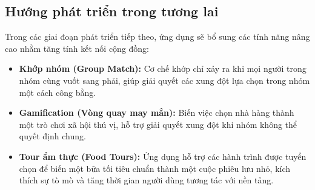 \subsection{Hướng phát triển trong tương lai}
Trong các giai đoạn phát triển tiếp theo, ứng dụng sẽ bổ sung các tính năng nâng cao nhằm tăng tính kết nối cộng đồng:
\begin{itemize}
    \item \textbf{Khớp nhóm (Group Match):} Cơ chế khớp chỉ xảy ra khi mọi người trong nhóm cùng vuốt sang phải, giúp giải quyết các xung đột lựa chọn trong nhóm một cách công bằng.
    \item \textbf{Gamification (Vòng quay may mắn):} Biến việc chọn nhà hàng thành một trò chơi xã hội thú vị, hỗ trợ giải quyết xung đột khi nhóm không thể quyết định chung.
    \item \textbf{Tour ẩm thực (Food Tours):} Ứng dụng hỗ trợ các hành trình được tuyển chọn để biến một bữa tối tiêu chuẩn thành một cuộc phiêu lưu nhỏ, kích thích sự tò mò và tăng thời gian người dùng tương tác với nền tảng.
\end{itemize}

